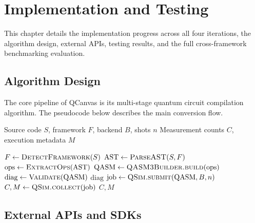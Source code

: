 \chapter{Implementation and Testing}
\label{ch:implementation}

This chapter details the implementation progress across all four iterations, the algorithm design, external APIs, testing results, and the full cross-framework benchmarking evaluation.

\section{Algorithm Design}

The core pipeline of QCanvas is its multi-stage quantum circuit compilation algorithm. The pseudocode below describes the main conversion flow.

\begin{algorithm}[H]
\caption{QCanvas Circuit Compilation Pipeline}
\begin{algorithmic}[1]
\Require Source code $S$, framework $F$, backend $B$, shots $n$
\Ensure Measurement counts $C$, execution metadata $M$

\State $F \gets \textsc{DetectFramework}(S)$  
\State $\text{AST} \gets \textsc{ParseAST}(S, F)$  
\State $\text{ops} \gets \textsc{ExtractOps}(\text{AST})$  
\State $\text{QASM} \gets \textsc{QASM3Builder.build}(\text{ops})$  
\State $\text{diag} \gets \textsc{Validate}(\text{QASM})$  
    \State \Return $\text{diag}$  
\EndIf
\State $\text{job} \gets \textsc{QSim.submit}(\text{QASM}, B, n)$  
\State $C, M \gets \textsc{QSim.collect}(\text{job})$  
\State \Return $C, M$
\end{algorithmic}
\end{algorithm}

\section{External APIs and SDKs}

